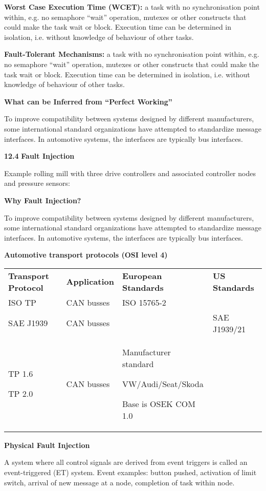 \textbf{Worst Case Execution Time (WCET):} a task with no
synchronisation point within, e.g. no semaphore ``wait'' operation,
mutexes or other constructs that could make the task wait or block.
Execution time can be determined in isolation, i.e. without knowledge of
behaviour of other tasks.

\textbf{Fault-Tolerant Mechanisms:} a task with no synchronisation point
within, e.g. no semaphore ``wait'' operation, mutexes or other
constructs that could make the task wait or block. Execution time can be
determined in isolation, i.e. without knowledge of behaviour of other
tasks.

\textbf{What can be Inferred from ``Perfect Working''}

To improve compatibility between systems designed by different
manufacturers, some international standard organizations have attempted
to standardize message interfaces. In automotive systems, the interfaces
are typically bus interfaces.

\textbf{12.4} \protect\hypertarget{teil5}{}{}\textbf{Fault Injection}

Example rolling mill with three drive controllers and associated
controller nodes and pressure sensors:

\textbf{Why Fault Injection?}

To improve compatibility between systems designed by different
manufacturers, some international standard organizations have attempted
to standardize message interfaces. In automotive systems, the interfaces
are typically bus interfaces.

\textbf{Automotive transport protocols (OSI level 4)}

\begin{longtable}[c]{@{}llll@{}}
\toprule
\textbf{Transport Protocol} & \textbf{Application} & \textbf{European
Standards} & \textbf{US Standards}\tabularnewline
ISO TP & CAN busses & ISO 15765-2 &\tabularnewline
SAE J1939 & CAN busses & & SAE J1939/21\tabularnewline
TP 1.6

TP 2.0 & CAN busses & Manufacturer standard

VW/Audi/Seat/Skoda

Base is OSEK COM 1.0 &\tabularnewline
\bottomrule
\end{longtable}

\textbf{Physical Fault Injection}

A system where all control signals are derived from event triggers is
called an event-triggered (ET) system. Event examples: button pushed,
activation of limit switch, arrival of new message at a node, completion
of task within node.

